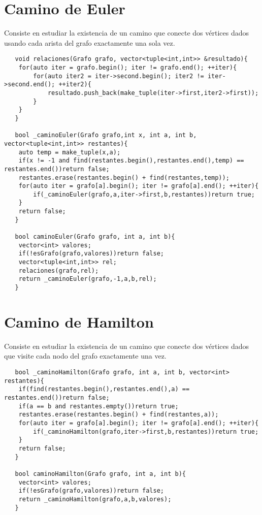 \documentclass[a4paper,12pt]{article}
\begin{document}
  \section{Camino de Euler}
  Consiste en estudiar la existencia de un camino que conecte dos vértices dados usando cada
  arista del grafo exactamente una sola vez.
  \begin{lstlisting}
   void relaciones(Grafo grafo, vector<tuple<int,int>> &resultado){
    for(auto iter = grafo.begin(); iter != grafo.end(); ++iter){
        for(auto iter2 = iter->second.begin(); iter2 != iter->second.end(); ++iter2){
            resultado.push_back(make_tuple(iter->first,iter2->first));
        }
    }
   }

   bool _caminoEuler(Grafo grafo,int x, int a, int b, vector<tuple<int,int>> restantes){
    auto temp = make_tuple(x,a);
    if(x != -1 and find(restantes.begin(),restantes.end(),temp) == restantes.end())return false;
    restantes.erase(restantes.begin() + find(restantes,temp));
    for(auto iter = grafo[a].begin(); iter != grafo[a].end(); ++iter){
        if(_caminoEuler(grafo,a,iter->first,b,restantes))return true;
    }
    return false;
   }

   bool caminoEuler(Grafo grafo, int a, int b){
    vector<int> valores;
    if(!esGrafo(grafo,valores))return false;
    vector<tuple<int,int>> rel;
    relaciones(grafo,rel);
    return _caminoEuler(grafo,-1,a,b,rel);
   }
  \end{lstlisting}

  
  \section{Camino de Hamilton}
  Consiste en estudiar la existencia de un camino que conecte dos vértices dados
  que visite cada nodo del grafo exactamente una vez.
  \begin{lstlisting}
   bool _caminoHamilton(Grafo grafo, int a, int b, vector<int> restantes){
    if(find(restantes.begin(),restantes.end(),a) == restantes.end())return false;
    if(a == b and restantes.empty())return true;
    restantes.erase(restantes.begin() + find(restantes,a));
    for(auto iter = grafo[a].begin(); iter != grafo[a].end(); ++iter){
        if(_caminoHamilton(grafo,iter->first,b,restantes))return true;
    }
    return false;
   }

   bool caminoHamilton(Grafo grafo, int a, int b){
    vector<int> valores;
    if(!esGrafo(grafo,valores))return false;
    return _caminoHamilton(grafo,a,b,valores);
   }
  \end{lstlisting}
\end{document}
